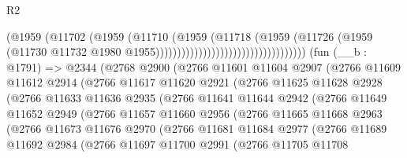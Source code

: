 \begin{lexlean}{R2}
\begin{coremodule}
                                                      (@1959
                                                        (@11702
                                                          (@1959
                                                            (@11710
                                                              (@1959
                                                                (@11718
                                                                  (@1959
                                                                    (@11726
                                                                      (@1959
                                                                        (@11730
                                                                          @11732
                                                                          @1980
                                                                          @1955)))))))))))))))))))))))))))))))))))
    (fun (__b : @1791) =>
    @2344
      (@2768
        @2900
        (@2766
          @11601
          @11604
          @2907
          (@2766
            @11609
            @11612
            @2914
            (@2766
              @11617
              @11620
              @2921
              (@2766
                @11625
                @11628
                @2928
                (@2766
                  @11633
                  @11636
                  @2935
                  (@2766
                    @11641
                    @11644
                    @2942
                    (@2766
                      @11649
                      @11652
                      @2949
                      (@2766
                        @11657
                        @11660
                        @2956
                        (@2766
                          @11665
                          @11668
                          @2963
                          (@2766
                            @11673
                            @11676
                            @2970
                            (@2766
                              @11681
                              @11684
                              @2977
                              (@2766
                                @11689
                                @11692
                                @2984
                                (@2766
                                  @11697
                                  @11700
                                  @2991
                                  (@2766
                                    @11705
                                    @11708

\end{coremodule}
\end{lexlean}
